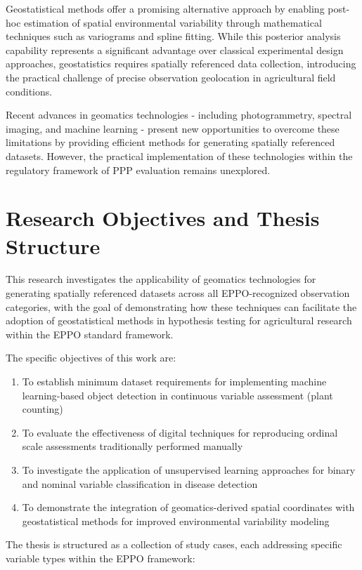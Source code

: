 \documentclass[12pt,a4paper,oneside]{report}
\begin{document}
Geostatistical methods offer a promising alternative approach by enabling post-hoc estimation of spatial environmental variability through mathematical techniques such as variograms and spline fitting. While this posterior analysis capability represents a significant advantage over classical experimental design approaches, geostatistics requires spatially referenced data collection, introducing the practical challenge of precise observation geolocation in agricultural field conditions.

Recent advances in geomatics technologies - including photogrammetry, spectral imaging, and machine learning - present new opportunities to overcome these limitations by providing efficient methods for generating spatially referenced datasets. However, the practical implementation of these technologies within the regulatory framework of PPP evaluation remains unexplored.

\section{Research Objectives and Thesis Structure}

This research investigates the applicability of geomatics technologies for generating spatially referenced datasets across all EPPO-recognized observation categories, with the goal of demonstrating how these techniques can facilitate the adoption of geostatistical methods in hypothesis testing for agricultural research within the EPPO standard framework.

The specific objectives of this work are:

\begin{enumerate}
    \item To establish minimum dataset requirements for implementing machine learning-based object detection in continuous variable assessment (plant counting)
    \item To evaluate the effectiveness of digital techniques for reproducing ordinal scale assessments traditionally performed manually
    \item To investigate the application of unsupervised learning approaches for binary and nominal variable classification in disease detection
    \item To demonstrate the integration of geomatics-derived spatial coordinates with geostatistical methods for improved environmental variability modeling
\end{enumerate}

The thesis is structured as a collection of study cases, each addressing specific variable types within the EPPO framework:
\end{document}
